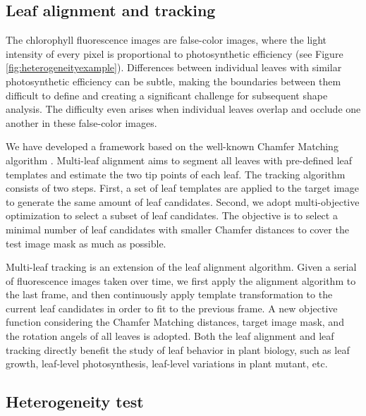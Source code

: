 {\subsection*{Leaf alignment and tracking}


The chlorophyll fluorescence images are false-color images, where the light intensity of every pixel is proportional to photosynthetic efficiency \cite{toet1996new} (see Figure \ref{fig:heterogeneityexample}). Differences between individual leaves with similar photosynthetic efficiency can be subtle, making the boundaries between them difficult to define and creating a significant challenge for subsequent shape analysis. The difficulty even arises when individual leaves overlap and occlude one another in these false-color images.

We have developed a framework based on the well-known Chamfer Matching algorithm \cite{yin2014}. Multi-leaf alignment aims to segment all leaves with pre-defined leaf templates and estimate the two tip points of each leaf. The tracking algorithm consists of two steps. First, a set of leaf templates are applied to the target image to generate the same amount of leaf candidates. Second, we adopt multi-objective optimization to select a subset of leaf candidates. The objective is to select a minimal number of leaf candidates with smaller Chamfer distances to cover the test image mask as much as possible.

Multi-leaf tracking is an extension of the leaf alignment algorithm. Given a serial of fluorescence images  taken over time, we first apply the alignment algorithm to the last frame, and then continuously apply template transformation to the current leaf candidates in order to fit to the previous frame. A new objective function considering the Chamfer Matching distances, target image mask, and the rotation angels of all leaves is adopted.
%
Both the leaf alignment and leaf tracking directly benefit the study of leaf behavior in plant biology, such as leaf growth, leaf-level photosynthesis, leaf-level variations in plant mutant, etc.

\subsection*{Heterogeneity test}

}

